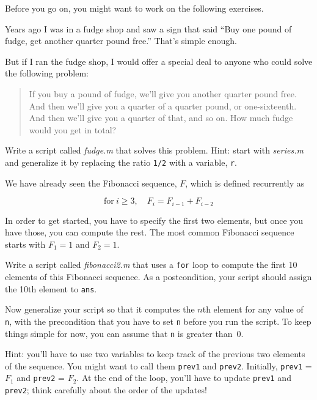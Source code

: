 Before you go on, you might want to work on the following exercises.

\begin{ex}
Years ago I was in a fudge shop and saw a sign that said ``Buy one pound of fudge, get another quarter pound free.''  That's simple enough.

But if I ran the fudge shop, I would offer a special deal to anyone who could solve the following problem:

\begin{quote}
If you buy a pound of fudge, we'll give you another quarter pound free.  And then we'll give you a quarter of a quarter pound, or one-sixteenth.  And then we'll give you a quarter of that, and so on.  How much fudge would you get in total?
\end{quote}

Write a script called \emph{fudge.m} that solves this problem.  Hint: start with \emph{series.m} and generalize it by replacing the ratio \lstinline{1/2} with a variable, \lstinline{r}.

\end{ex}




\begin{ex}
\label{fib2}

We have already seen the Fibonacci sequence, $F$, which
is defined recurrently as

\[ \mathrm{for}~i \ge 3, \quad  F_{i} = F_{i-1} + F_{i-2} \]

In order to get started, you have to specify the first two
elements, but once you have those, you can compute the rest.
The most common Fibonacci sequence starts with $F_1 = 1$ and $F_2 = 1$.

Write a script called \emph{fibonacci2.m} that uses a \lstinline{for} loop
to compute the first 10 elements of this Fibonacci sequence.
As a postcondition, your script should assign the 10th element to
\lstinline{ans}.

Now generalize your script so that it computes the $n$th element
for any value of \lstinline{n}, with the precondition that you have to
set \lstinline{n} before you run the script.  To keep things simple for
now, you can assume that \lstinline{n} is greater than~0.

Hint: you'll have to use two variables to keep track of the
previous two elements of the sequence.  You might want to call
them \lstinline{prev1} and \lstinline{prev2}.  Initially, \lstinline{prev1} = $F_1$
and \lstinline{prev2} = $F_2$.  At the end of the loop, you'll have
to update \lstinline{prev1} and \lstinline{prev2}; think carefully about the
order of the updates!

\end{ex}

